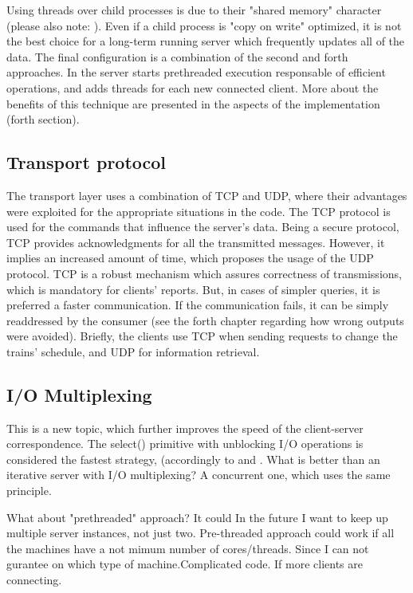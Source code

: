 \documentclass[runningheads]{llncs}
\begin{document}
Using threads over child processes is due to their "shared memory" character (please also note: \cite{fork-vs-thread}). Even if a child process is "copy on write" optimized, it is not the best choice for a long-term running server which frequently updates all of the data. 
The final configuration is a combination of the second and forth approaches. In the server starts prethreaded execution responsable of efficient operations, and adds threads for each new connected client. More about the benefits of this technique are presented in the aspects of the implementation (forth section).

\subsection{Transport protocol}

The transport layer uses a combination of TCP and UDP, where their advantages were exploited for the appropriate situations in the code.
The TCP protocol is used for the commands that influence the server's data. Being a secure protocol, TCP provides acknowledgments for all the transmitted messages. However, it implies an increased amount of time, which proposes the usage of the UDP protocol. TCP is a robust mechanism which assures correctness of transmissions, which is mandatory for clients' reports. But, in cases of simpler queries, it is preferred a faster communication. If the communication fails, it can be simply readdressed by the consumer (see the forth chapter regarding how wrong outputs were avoided).
Briefly, the clients use TCP when sending requests to change the trains' schedule, and UDP for information retrieval.

\subsection{I/O Multiplexing}

This is a new topic, which further improves the speed of the client-server correspondence. The select() primitive with unblocking I/O operations is considered the fastest strategy, (accordingly to \cite{non-block-select} and \cite{course}. What is better than an iterative server with I/O multiplexing? A concurrent one, which uses the same principle.



What about "prethreaded" approach? It could In the future I want to keep up multiple server instances, not just two. Pre-threaded approach could work if all the machines have a not mimum number of cores/threads. Since I can not gurantee on which type of machine.Complicated code. If more clients are connecting.
\end{document}
